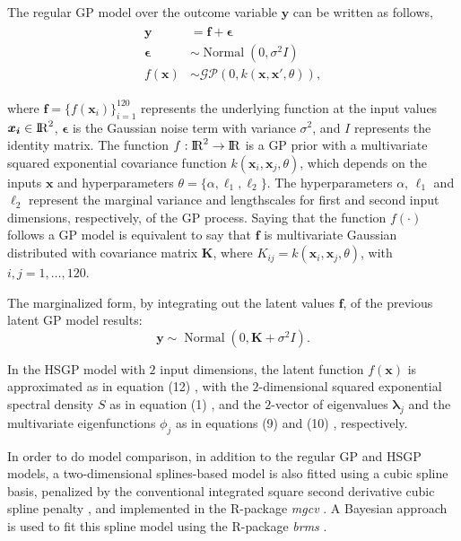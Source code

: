 \documentclass[onecolumn,a4paper,11pt]{article}
\DeclareMathOperator{\Normal}{Normal}
\begin{document}
The regular GP model over the outcome variable $\bm{y}$ can be written as follows,
%
\begin{eqnarray*}\label{ch5_eq_latentgp_simudata2}
\begin{split}
\bm{y} &= \bm{f} + \bm{\epsilon} \\
\bm{\epsilon} &\sim \Normal(0, \sigma^2  I) \\
f(\bm{x}) &\sim \mathcal{GP}(0, k(\bm{x}, \bm{x}', \theta)),
\end{split}
\end{eqnarray*}

\noindent where $\bm{f}=\{f(\bm{x}_i)\}_{i=1}^{120}$ represents the underlying function at the input values $\bm{x_i}\in {\rm I\!R}^{2}$, $\bm{\epsilon}$ is the Gaussian noise term with variance $\sigma^2$, and $I$ represents the identity matrix. The function $f:{\rm I\!R}^2 \to {\rm I\!R}$ is a GP prior with a multivariate squared exponential covariance function $k(\bm{x}_i,\bm{x}_j,\theta)$, which depends on the inputs $\bm{x}$ and hyperparameters $\theta=\{\alpha,\ell_1,\ell_2\}$. The hyperparameters $\alpha$, $\ell_1$ and $\ell_2$ represent the marginal variance and lengthscales for first and second input dimensions, respectively, of the GP process. Saying that the function $f(\cdot)$ follows a GP model is equivalent to say that $\bm{f}$ is multivariate Gaussian distributed with covariance matrix $\bm{K}$, where $K_{ij}=k(\bm{x}_i,\bm{x}_j,\theta)$, with $i,j=1,\dots,120$.

The marginalized form, by integrating out the latent values $\bm{f}$, of the previous latent GP model results:
%
\begin{equation*}\label{ch5_eq_marginalizedgp_simudata2}
\bm{y} \sim \Normal(0, \bm{K} + \sigma^2 I ).
\end{equation*}

In the HSGP model with $2$ input dimensions, the latent function $f(\bm{x})$ is approximated as in equation (12)%
, with the $2$-dimensional squared exponential spectral density $S$ as in equation (1)%
, and the $2$-vector of eigenvalues $\bm{\lambda}_j$ and the multivariate eigenfunctions $\phi_j$ as in equations (9) %
 and (10)%
 , respectively.


In order to do model comparison, in addition to the regular GP and HSGP models, a two-dimensional splines-based model is also fitted using a cubic spline basis, penalized by the conventional integrated square second derivative cubic spline penalty \citep{wood2017generalized}, and implemented in the R-package \textit{mgcv} \citep{wood2011mgcv}. A Bayesian approach is used to fit this spline model using the R-package \textit{brms} \citep{burkner2017brms}.
\end{document}
